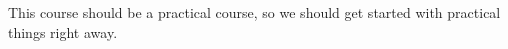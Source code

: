 %
%
This course should be a practical course, so we should get started with practical things right away.
%
%
%
\endhsection%
%
